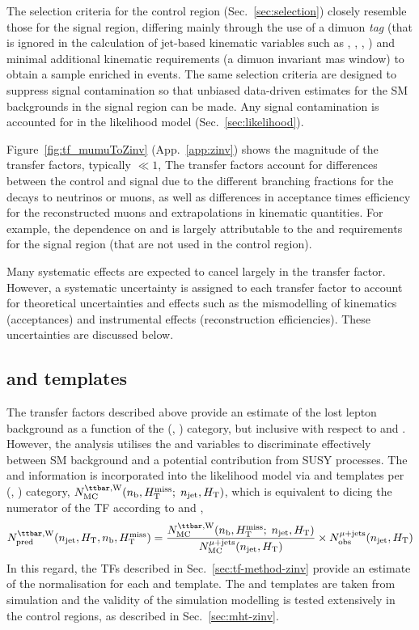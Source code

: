 The selection criteria for the \mmj control region
(Sec.~\ref{sec:selection}) closely resemble those for the signal
region, differing mainly through the use of a dimuon {\it tag} (that
is ignored in the calculation of jet-based kinematic variables such as
\scalht, \mht, \alphat, \etc) and minimal additional kinematic
requirements (\eg a dimuon invariant mas window) to obtain a sample
enriched in \zmmj events. The same selection criteria are designed to
suppress signal contamination so that unbiased data-driven estimates
for the SM backgrounds in the signal region can be made. Any signal
contamination is accounted for in the likelihood model
(Sec.~\ref{sec:likelihood}).

Figure~\ref{fig:tf_mumuToZinv} (App.~\ref{app:zinv}) shows the
magnitude of the transfer factors, typically $\ll 1$, The transfer
factors account for differences between the \mmj control and signal
due to the different branching fractions for the decays to neutrinos
or muons, as well as differences in acceptance times efficiency for
the reconstructed muons and extrapolations in kinematic
quantities. For example, the dependence on \njet and \scalht is
largely attributable to the \alphat and \bdphi requirements for the
signal region (that are not used in the \mmj control region).

Many systematic effects are expected to cancel largely in the transfer
factor. However, a systematic uncertainty is assigned to each transfer
factor to account for theoretical uncertainties and effects such as
the mismodelling of kinematics (\eg acceptances) and instrumental
effects (\eg reconstruction efficiencies). These uncertainties are
discussed below. 

\subsection{\texorpdfstring{\nb}{Nb} and \texorpdfstring{\mht}{MHT} templates}

The transfer factors described above provide an estimate of the lost
lepton background as a function of the (\njet, \scalht) category, but
inclusive with respect to \nb and \mht. However, the analysis utilises
the \nb and \mht variables to discriminate effectively between SM
background and \eg a potential contribution from SUSY processes. The
\nb and \HTmiss information is incorporated into the likelihood model
via \nb and \mht templates per (\njet, \scalht) category, $N_{\rm
  MC}^{\ttw}(\nb, \HTmiss;\; \njet, \scalht)$, which is equivalent to
dicing the numerator of the TF according to \nb and \mht, \ie
\begin{equation}
  \label{equ:pred-method-zinv-mht}
  \npre^{\ttw}(\njet, \scalht, \nb, \HTmiss) = 
  \frac{N_{\rm MC}^{\ttw}(\nb, \HTmiss;\; \njet, \scalht)}{N_{\rm MC}^{\mj}(\njet, \scalht)} 
  \times 
  \nobs^{\mj}(\njet, \scalht)
\end{equation}
In this regard, the TFs described in Sec.~\ref{sec:tf-method-zinv}
provide an estimate of the normalisation for each \nb and \mht
template. The \nb and \HTmiss templates are taken from simulation and
the validity of the simulation modelling is tested extensively in the
control regions, as described in Sec.~\ref{sec:mht-zinv}.

